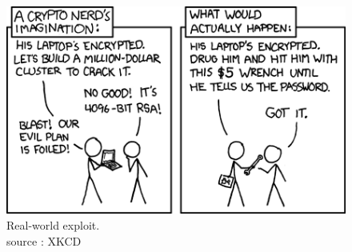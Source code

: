 \begin{figure}[hb!]
    \centering
       \includegraphics{images/rubberhose.png}
	\caption{Real-world exploit. \\ source : XKCD}
	\label{fig:RC4}
\end{figure}

